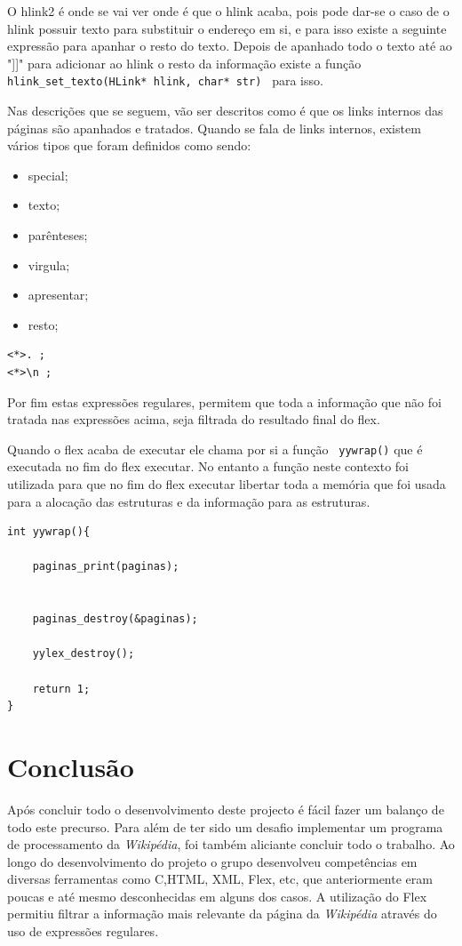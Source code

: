 \documentclass[11pt, a4paper, oneside]{article}
\begin{document}
O hlink2 é onde se vai ver onde é que o hlink acaba, pois pode dar-se o caso de o hlink possuir texto para substituir o endereço em si, e para isso existe a seguinte expressão para apanhar o resto do texto. Depois de apanhado todo o texto até ao "]]" para adicionar ao hlink o resto da informação existe a função \texttt{ hlink\_set\_texto(HLink* hlink, char* str) } para isso.

Nas descrições que se seguem, vão ser descritos como é que os links internos das páginas são apanhados e tratados.
Quando se fala de links internos, existem vários tipos que foram definidos como sendo:
\begin{itemize}
\item special;
\item texto;
\item parênteses;
\item virgula;
\item apresentar;
\item resto;
\end{itemize}



\begin{verbatim}
<*>. ;
<*>\n ;
\end{verbatim}

Por fim estas expressões regulares, permitem que toda a informação que não foi tratada nas expressões acima, seja filtrada do resultado final do flex.

Quando o flex acaba de executar ele chama por si a função \texttt{ yywrap()} que é executada no fim do flex executar.
No entanto a função neste contexto foi utilizada para que no fim do flex executar libertar toda a memória que foi usada para a alocação das estruturas e da informação para as estruturas.

\begin{verbatim}
int yywrap(){

    paginas_print(paginas);

 
    paginas_destroy(&paginas);
    
    yylex_destroy();

    return 1;
}
\end{verbatim}



\newpage
\section{Conclusão}

Após concluir todo o desenvolvimento deste projecto é fácil fazer um balanço de todo este precurso. Para além de ter sido um desafio implementar um programa de processamento da \textit{Wikipédia}, foi também aliciante concluir todo o trabalho.
Ao longo do desenvolvimento do projeto o grupo desenvolveu competências em diversas ferramentas como C,HTML, XML, Flex, etc, que anteriormente eram poucas e até mesmo desconhecidas em alguns dos casos. 
A utilização do Flex permitiu filtrar a informação mais relevante da página da \textit{Wikipédia} através do uso de expressões regulares. 
\newpage
\end{document}

